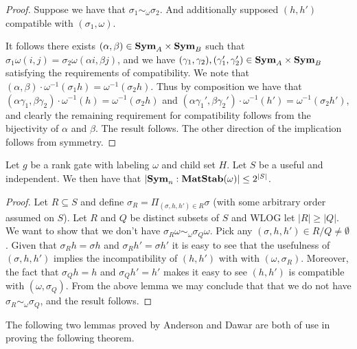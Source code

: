 \documentclass[../paper.tex]{subfiles}
\begin{document}
\begin{proof}
  Suppose we have that $\sigma_1 \sim_\omega \sigma_2$. And additionally
  supposed $(h, h')$ compatible with $(\sigma_1, \omega)$.

  It follows there exists $(\alpha, \beta) \in \text{\textbf{Sym}}_A \times \text{\textbf{Sym}}_B$ such that
  $\sigma_1 \omega (i,j) = \sigma_2\omega (\alpha i, \beta j)$, and we have
  $(\gamma_1, \gamma_2), (\gamma_1', \gamma_2') \in \text{\textbf{Sym}}_A \times \text{\textbf{Sym}}_B$
  satisfying the requirements of compatibility. We note that $(\alpha, \beta)
  \cdot \omega^{-1}(\sigma_1 h) = \omega^{-1}(\sigma_2 h)$. Thus by composition
  we have that $(\alpha \gamma_1, \beta \gamma_2) \cdot \omega^{-1}(h) =
  \omega^{-1}(\sigma_2 h)$ and $(\alpha \gamma_1', \beta \gamma_2') \cdot
  \omega^{-1}(h') = \omega^{-1}(\sigma_2 h')$, and clearly the remaining
  requirement for compatibility follows from the bijectivity of $\alpha$ and
  $\beta$. The result follows. The other direction of the implication follows
  from symmetry.
\end{proof}

\begin{claim}
  \label{claim:useful-independant-set}
  Let $g$ be a rank gate with labeling $\omega$ and child set $H$. Let $S$ be a
  useful and independent. We then have that $\vert \text{\textbf{Sym}}_n: \text{\textbf{MatStab}}(\omega)
  \vert \leq 2^{\vert S \vert}$.
\end{claim}

\begin{proof}
  Let $R \subseteq S$ and define $\sigma_R = \Pi_{(\sigma, h, h') \in R} \sigma$
  (with some arbitrary order assumed on $S$). Let $R$ and $Q$ be distinct
  subsets of $S$ and WLOG let $\vert R \vert \geq \vert Q \vert$. We want to
  show that we don't have $\sigma_R \omega \sim_\omega \sigma_Q \omega$. Pick
  any $(\sigma, h, h') \in R/Q \neq \emptyset$. Given that $\sigma_R h = \sigma
  h$ and $\sigma_R h' = \sigma h'$ it is easy to see that the usefulness of
  $(\sigma, h,h')$ implies the incompatibility of $(h,h')$ with with $(\omega,
  \sigma_R)$. Moreover, the fact that $\sigma_Q h = h$ and $\sigma_Q h' = h'$
  makes it easy to see $(h,h')$ is compatible with $(\omega, \sigma_Q)$. From
  the above lemma we may conclude that that we do not have $\sigma_R \sim_\omega
  \sigma_Q$, and the result follows.
\end{proof}

The following two lemmas proved by Anderson and Dawar \cite{AndersonD17} are
both of use in proving the following theorem.
\end{document}
